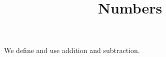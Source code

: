 \documentclass{ximera}
\title{Numbers}
\begin{document}
\begin{abstract}
\end{abstract}
\maketitle

We define and use addition and subtraction.
\end{document}
